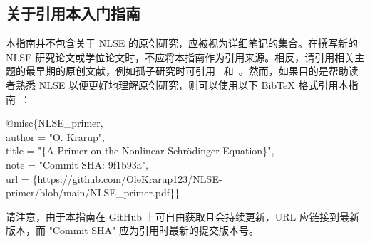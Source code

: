 \subsection{关于引用本入门指南}
本指南并不包含关于 NLSE 的原创研究，应被视为详细笔记的集合。在撰写新的 NLSE 研究论文或学位论文时，不应将本指南作为引用来源。相反，请引用相关主题的最早期的原创文献，例如孤子研究时可引用~\cite{soliton_first_theory} 和~\cite{Soliton_experimental_first}。然而，如果目的是帮助读者熟悉 NLSE 以便更好地理解原创研究，则可以使用以下 BibTeX 格式引用本指南~\cite{NLSE_primer}：

\begin{boxA}
@misc\{NLSE\_primer,  \\  
author = "O. Krarup", \\  
title = "\{A Primer on the Nonlinear Schrödinger Equation\}", \\  
note = "Commit SHA: 9f1b93a", \\  
url = \{https://github.com/OleKrarup123/NLSE-primer/blob/main/NLSE\_primer.pdf\}\}  
\end{boxA}

请注意，由于本指南在 GitHub 上可自由获取且会持续更新，URL 应链接到最新版本，而 "Commit SHA" 应为引用时最新的提交版本号。    